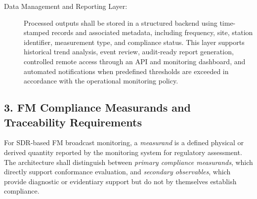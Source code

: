 \documentclass[11pt]{report}
\begin{document}
\begin{description}
	\item[Data Management and Reporting Layer:]
	Processed outputs shall be stored in a structured backend using time-stamped records and associated metadata, including frequency, site, station identifier, measurement type, and compliance status. This layer supports historical trend analysis, event review, audit-ready report generation, controlled remote access through an API and monitoring dashboard, and automated notifications when predefined thresholds are exceeded in accordance with the operational monitoring policy.
	
\end{description}

\newpage
\subsection*{3. FM Compliance Measurands and Traceability Requirements}\;

\noindent
For SDR-based FM broadcast monitoring, a \emph{measurand} is a defined physical or derived quantity reported by the monitoring system for regulatory assessment. The architecture shall distinguish between \emph{primary compliance measurands}, which directly support conformance evaluation, and \emph{secondary observables}, which provide diagnostic or evidentiary support but do not by themselves establish compliance.
\end{document}
